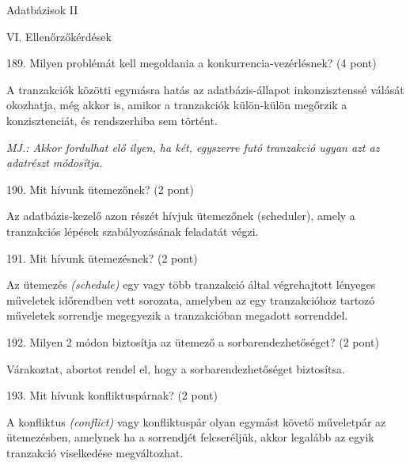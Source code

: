 \documentclass[a4paper,11.5pt, table]{article}
\begin{document}
	\begin{center}
		{\LARGE Adatbázisok II}
		\smallskip
		
		{\large VI. Ellenőrzőkérdések}
	\end{center}
189. Milyen problémát kell megoldania a konkurrencia-vezérlésnek? (4 pont)
	\begin{compactitem}
		\item A tranzakciók közötti egymásra hatás az adatbázis-állapot inkonzisztenssé válását okozhatja, még akkor is, amikor a tranzakciók külön-külön megőrzik a konzisztenciát, és rendszerhiba sem történt. 
		\item \textit{MJ.: Akkor fordulhat elő ilyen, ha két, egyszerre futó tranzakció ugyan azt az adatrészt módosítja.}
	\end{compactitem}

190. Mit hívunk ütemezőnek? (2 pont)
	\begin{compactitem}
		\item Az adatbázis-kezelő azon részét hívjuk ütemezőnek (scheduler), amely a tranzakciós lépések szabályozásának feladatát végzi.
	\end{compactitem}

191. Mit hívunk ütemezésnek? (2 pont)
	\begin{compactitem}
		\item Az ütemezés \textit{(schedule)} egy vagy több tranzakció által végrehajtott lényeges műveletek időrendben vett sorozata, amelyben az egy tranzakcióhoz tartozó műveletek sorrendje megegyezik a tranzakcióban megadott sorrenddel. 
	\end{compactitem}

192. Milyen 2 módon biztosítja az ütemező a sorbarendezhetőséget? (2 pont)
	\begin{compactitem}
		\item Várakoztat, abortot rendel el, hogy a sorbarendezhetőséget biztosítsa.
	\end{compactitem}

193. Mit hívunk konfliktuspárnak? (2 pont)
	\begin{compactitem}
		\item A konfliktus \textit{(conflict)} vagy konfliktuspár olyan egymást követő műveletpár az ütemezésben, amelynek ha a sorrendjét felcseréljük, akkor legalább az egyik tranzakció viselkedése megváltozhat.
	\end{compactitem}
\end{document}
